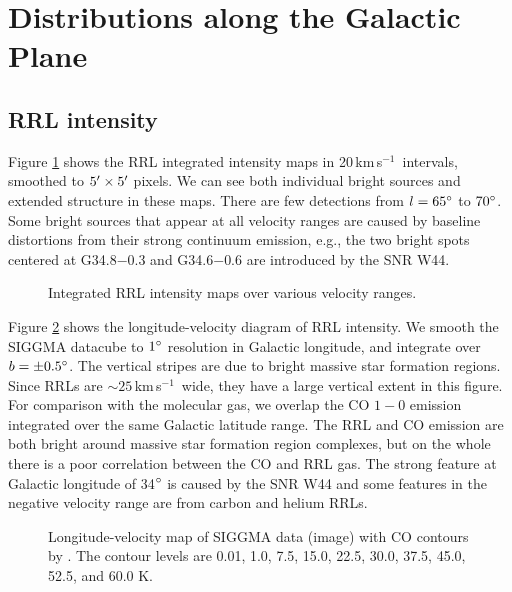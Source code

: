 \documentclass[manuscript]{aastex61}
\newcommand{\kms}{\,km\,s$^{-1}$}
\begin{document}
\section{Distributions along the Galactic Plane} \label{sec_gal}
\subsection{RRL intensity} \label{sec_gal_rrl}
Figure \ref{fig_rrl_map} shows the RRL integrated intensity maps in 20\kms\ intervals, smoothed to $5\mbox{$^\prime$} \times 5\mbox{$^\prime$}$ pixels.
We can see both individual bright sources and extended structure in these maps.
There are few detections from $l=65\mbox{$^\circ$}$ to $70\mbox{$^\circ$}$. 
Some bright sources that appear at all velocity ranges are caused by baseline distortions from their strong continuum emission, e.g., the two bright spots centered at G34.8$-$0.3 and G34.6$-$0.6 are introduced by the SNR W44.

\begin{figure}[htbp]
\caption{Integrated RRL intensity maps over various velocity ranges.
}\label{fig_rrl_map}
\end{figure}

Figure \ref{lv_map} shows the longitude-velocity diagram of RRL intensity.
We smooth the SIGGMA datacube to $1\mbox{$^\circ$}$ resolution in Galactic longitude, and integrate over $b = \pm 0.5 \mbox{$^\circ$}$.
The vertical stripes are due to bright massive star formation regions.  Since RRLs are $\sim 25$\kms\ wide, they have a large vertical extent in this figure.
For comparison with the molecular gas, we overlap the CO $1-0$ emission \citep{Dame2001} integrated over the same Galactic latitude range.
The RRL and CO emission are both bright around massive star formation region complexes, but on the whole there is a poor correlation between the CO and RRL gas.
The strong feature at Galactic longitude of 34$\mbox{$^\circ$}$ is caused by the SNR W44 and some features in the negative velocity range are from carbon and helium RRLs.
\begin{figure}[htbp]
\centering
{}
\caption{Longitude-velocity map of  SIGGMA data (image) with CO contours by \citep{Dame2001}. The contour levels are 0.01, 1.0, 7.5, 15.0, 22.5, 30.0, 37.5, 45.0, 52.5, and 60.0 K.}\label{lv_map}
\end{figure}
\end{document}
